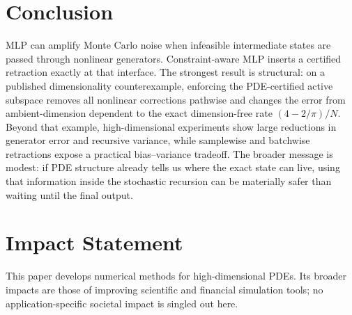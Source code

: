 \section{Conclusion}
MLP can amplify Monte Carlo noise when infeasible intermediate states are passed through nonlinear generators. Constraint-aware MLP inserts a certified retraction exactly at that interface. The strongest result is structural: on a published dimensionality counterexample, enforcing the PDE-certified active subspace removes all nonlinear corrections pathwise and changes the error from ambient-dimension dependent to the exact dimension-free rate $(4-2/\pi)/N$. Beyond that example, high-dimensional experiments show large reductions in generator error and recursive variance, while samplewise and batchwise retractions expose a practical bias--variance tradeoff. The broader message is modest: if PDE structure already tells us where the exact state can live, using that information inside the stochastic recursion can be materially safer than waiting until the final output.

\section*{Impact Statement}
This paper develops numerical methods for high-dimensional PDEs. Its broader impacts are those of improving scientific and financial simulation tools; no application-specific societal impact is singled out here.

